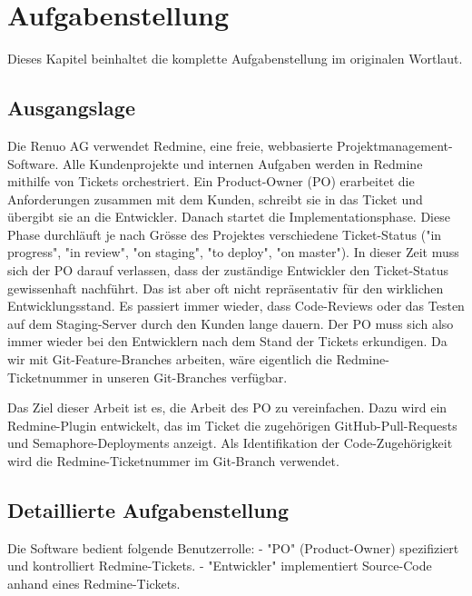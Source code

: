 \chapter{Aufgabenstellung}

Dieses Kapitel beinhaltet die komplette Aufgabenstellung im originalen Wortlaut.

\section{Ausgangslage}

Die Renuo AG verwendet Redmine, eine freie, webbasierte Projektmanagement-Software. Alle Kundenprojekte und internen Aufgaben werden in Redmine mithilfe von Tickets orchestriert. Ein Product-Owner (PO) erarbeitet die Anforderungen zusammen mit dem Kunden, schreibt sie in das Ticket und übergibt sie an die Entwickler. Danach startet die Implementationsphase. Diese Phase durchläuft je nach Grösse des Projektes verschiedene Ticket-Status ("in progress", "in review", "on staging", "to deploy", "on master"). In dieser Zeit muss sich der PO darauf verlassen, dass der zuständige Entwickler den Ticket-Status gewissenhaft nachführt. Das ist aber oft nicht repräsentativ für den wirklichen Entwicklungsstand. Es passiert immer wieder, dass Code-Reviews oder das Testen auf dem Staging-Server durch den Kunden lange dauern. Der PO muss sich also immer wieder bei den Entwicklern nach dem Stand der Tickets erkundigen. Da wir mit Git-Feature-Branches arbeiten, wäre eigentlich die Redmine-Ticketnummer in unseren Git-Branches verfügbar.

Das Ziel dieser Arbeit ist es, die Arbeit des PO zu vereinfachen. Dazu wird ein Redmine-Plugin entwickelt, das im Ticket die zugehörigen GitHub-Pull-Requests und Semaphore-Deployments anzeigt. Als Identifikation der Code-Zugehörigkeit wird die Redmine-Ticketnummer im Git-Branch verwendet.

\section{Detaillierte Aufgabenstellung}

Die Software bedient folgende Benutzerrolle: \newline
- "PO" (Product-Owner) spezifiziert und kontrolliert Redmine-Tickets. \newline
- "Entwickler" implementiert Source-Code anhand eines Redmine-Tickets. \newline

